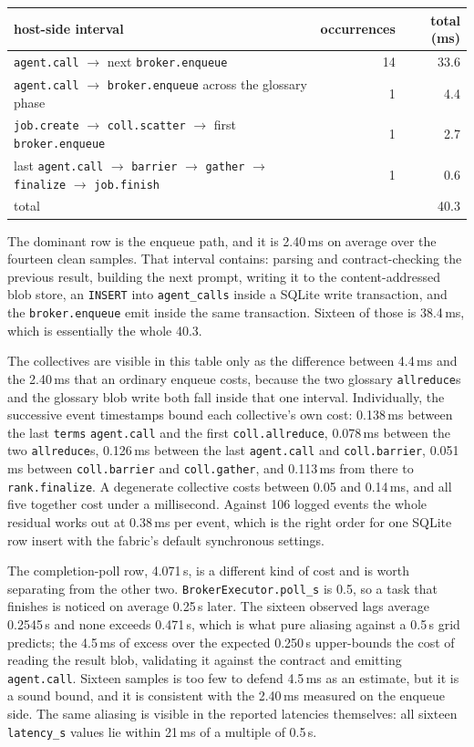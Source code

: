 \documentclass[11pt]{article}
\begin{document}
\begin{center}
\begin{tabular}{@{}lrr@{}}
\toprule
  host-side interval & occurrences & total (ms) \\
\midrule
  \texttt{agent.call} $\to$ next \texttt{broker.enqueue} & 14 & 33.6 \\
  \texttt{agent.call} $\to$ \texttt{broker.enqueue} across the glossary phase & 1 & 4.4 \\
  \texttt{job.create} $\to$ \texttt{coll.scatter} $\to$ first \texttt{broker.enqueue} & 1 & 2.7 \\
  last \texttt{agent.call} $\to$ \texttt{barrier} $\to$ \texttt{gather} $\to$ \texttt{finalize} $\to$ \texttt{job.finish} & 1 & 0.6 \\
\midrule
  total & & 40.3 \\
\bottomrule
\end{tabular}
\end{center}

The dominant row is the enqueue path, and it is 2.40\,ms on average over the fourteen clean
samples. That interval contains: parsing and contract-checking the previous result, building the
next prompt, writing it to the content-addressed blob store, an \texttt{INSERT} into
\texttt{agent\_calls} inside a SQLite write transaction, and the \texttt{broker.enqueue} emit
inside the same transaction. Sixteen of those is 38.4\,ms, which is essentially the whole 40.3.

The collectives are visible in this table only as the difference between 4.4\,ms and the 2.40\,ms
that an ordinary enqueue costs, because the two glossary \texttt{allreduce}s and the glossary
blob write both fall inside that one interval. Individually, the successive event timestamps
bound each collective's own cost: 0.138\,ms between the last \texttt{terms} \texttt{agent.call}
and the first \texttt{coll.allreduce}, 0.078\,ms between the two \texttt{allreduce}s, 0.126\,ms
between the last \texttt{agent.call} and \texttt{coll.barrier}, 0.051\,ms between
\texttt{coll.barrier} and \texttt{coll.gather}, and 0.113\,ms from there to
\texttt{rank.finalize}. A degenerate collective costs between 0.05 and 0.14\,ms, and all five
together cost under a millisecond. Against 106 logged events the whole residual works out at
0.38\,ms per event, which is the right order for one SQLite row insert with the fabric's default
synchronous settings.

The completion-poll row, 4.071\,s, is a different kind of cost and is worth separating from the
other two. \texttt{BrokerExecutor.poll\_s} is 0.5, so a task that finishes is noticed on average
0.25\,s later. The sixteen observed lags average 0.2545\,s and none exceeds 0.471\,s, which is
what pure aliasing against a 0.5\,s grid predicts; the 4.5\,ms of excess over the expected
0.250\,s upper-bounds the cost of reading the result blob, validating it against the contract and
emitting \texttt{agent.call}. Sixteen samples is too few to defend 4.5\,ms as an estimate, but it
is a sound bound, and it is consistent with the 2.40\,ms measured on the enqueue side. The same
aliasing is visible in the reported latencies themselves: all sixteen \texttt{latency\_s} values
lie within 21\,ms of a multiple of 0.5\,s.
\end{document}
